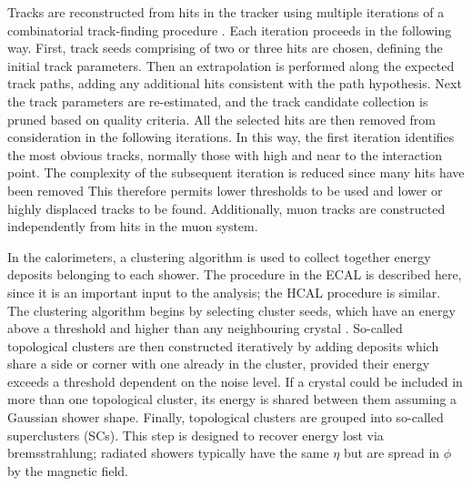Tracks are reconstructed from hits in the tracker using multiple iterations of a combinatorial track-finding procedure \cite{TrackReco}.
Each iteration proceeds in the following way.
First, track seeds comprising of two or three hits are chosen, defining the initial track parameters.
Then an extrapolation is performed along the expected track paths, adding any additional hits consistent with the path hypothesis.
Next the track parameters are re-estimated, and the track candidate collection is pruned based on quality criteria.
All the selected hits are then removed from consideration in the following iterations.
In this way, the first iteration identifies the most obvious tracks, normally those with high \pt and near to the interaction point.
The complexity of the subsequent iteration is reduced since many hits have been removed
This therefore permits lower thresholds to be used and lower \pt or highly displaced tracks to be found.
Additionally, muon tracks are constructed independently from hits in the muon system.

In the calorimeters, a clustering algorithm is used to collect together energy deposits belonging to each shower. %
The procedure in the ECAL is described here, since it is an important input to the \Hgg analysis; the HCAL procedure is similar.
The clustering algorithm begins by selecting cluster seeds, which have an energy above a threshold and higher than any neighbouring crystal \cite{PhotonReco}.
So-called topological clusters are then constructed iteratively by adding deposits which share a side or corner with one already in the cluster, 
provided their energy exceeds a threshold dependent on the noise level. %
If a crystal could be included in more than one topological cluster, its energy is shared between them assuming a Gaussian shower shape.
Finally, topological clusters are grouped into so-called superclusters (SCs).
This step is designed to recover energy lost via bremsstrahlung; 
radiated showers typically have the same $\eta$ but are spread in $\phi$ by the magnetic field.

